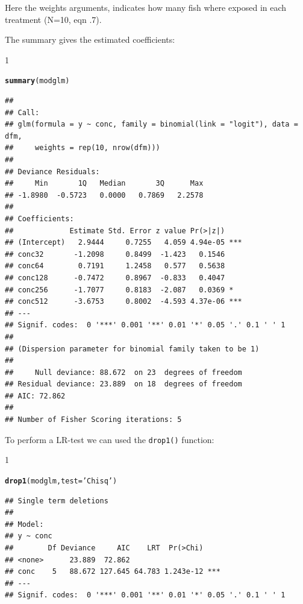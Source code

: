 \documentclass{scrartcl}\usepackage[]{graphicx}\usepackage[]{color}
\makeatletter
\newcommand{\hlstr}[1]{\textcolor[rgb]{0.192,0.494,0.8}{#1}}%
\newcommand{\hlstd}[1]{\textcolor[rgb]{0.345,0.345,0.345}{#1}}%
\newcommand{\hlkwc}[1]{\textcolor[rgb]{0.333,0.667,0.333}{#1}}%
\newcommand{\hlkwd}[1]{\textcolor[rgb]{0.737,0.353,0.396}{\textbf{#1}}}%
\newenvironment{kframe}{%
 \def\at@end@of@kframe{}%
 \ifinner\ifhmode%
  \def\at@end@of@kframe{\end{minipage}}%
  \begin{minipage}{\columnwidth}%
 \fi\fi%
 \def\FrameCommand##1{\hskip\@totalleftmargin \hskip-\fboxsep
 \colorbox{shadecolor}{##1}\hskip-\fboxsep
     \hskip-\linewidth \hskip-\@totalleftmargin \hskip\columnwidth}%
 \MakeFramed {\advance\hsize-\width
   \@totalleftmargin\z@ \linewidth\hsize
   \@setminipage}}%
 {\par\unskip\endMakeFramed%
 \at@end@of@kframe}
\newenvironment{knitrout}{}{} %
\renewenvironment{knitrout}{\begin{spacing}{1}}{\end{spacing}}
\makeatother
\begin{document}
Here the weights arguments, indicates how many fish where exposed in each treatment (N=10, eqn .7).

The summary gives the estimated coefficients:
\begin{knitrout}
\color{fgcolor}\begin{kframe}
\begin{alltt}
\hlkwd{summary}\hlstd{(modglm)}
\end{alltt}
\begin{verbatim}
## 
## Call:
## glm(formula = y ~ conc, family = binomial(link = "logit"), data = dfm, 
##     weights = rep(10, nrow(dfm)))
## 
## Deviance Residuals: 
##     Min       1Q   Median       3Q      Max  
## -1.8980  -0.5723   0.0000   0.7869   2.2578  
## 
## Coefficients:
##             Estimate Std. Error z value Pr(>|z|)    
## (Intercept)   2.9444     0.7255   4.059 4.94e-05 ***
## conc32       -1.2098     0.8499  -1.423   0.1546    
## conc64        0.7191     1.2458   0.577   0.5638    
## conc128      -0.7472     0.8967  -0.833   0.4047    
## conc256      -1.7077     0.8183  -2.087   0.0369 *  
## conc512      -3.6753     0.8002  -4.593 4.37e-06 ***
## ---
## Signif. codes:  0 '***' 0.001 '**' 0.01 '*' 0.05 '.' 0.1 ' ' 1
## 
## (Dispersion parameter for binomial family taken to be 1)
## 
##     Null deviance: 88.672  on 23  degrees of freedom
## Residual deviance: 23.889  on 18  degrees of freedom
## AIC: 72.862
## 
## Number of Fisher Scoring iterations: 5
\end{verbatim}
\end{kframe}
\end{knitrout}

To perform a LR-test we can used the \texttt{drop1()} function:
\begin{knitrout}
\color{fgcolor}\begin{kframe}
\begin{alltt}
\hlkwd{drop1}\hlstd{(modglm,} \hlkwc{test} \hlstd{=} \hlstr{'Chisq'}\hlstd{)}
\end{alltt}
\begin{verbatim}
## Single term deletions
## 
## Model:
## y ~ conc
##        Df Deviance     AIC    LRT  Pr(>Chi)    
## <none>      23.889  72.862                     
## conc    5   88.672 127.645 64.783 1.243e-12 ***
## ---
## Signif. codes:  0 '***' 0.001 '**' 0.01 '*' 0.05 '.' 0.1 ' ' 1
\end{verbatim}
\end{kframe}
\end{knitrout}
\end{document}
